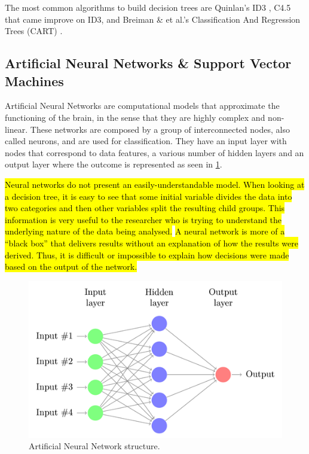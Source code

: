 The most common algorithms to build decision trees are Quinlan’s ID3 \cite{Quinlan1986}, C4.5
 \cite{Quinlan1993} that came improve on ID3, and Breiman \& et al.’s Classification And 
 Regression Trees (CART) \cite{Breiman1984}.

\subsection{Artificial Neural Networks \& Support Vector Machines}
\label{subsection:nn}

Artificial Neural Networks are computational models that approximate the functioning of the brain, in the sense that they are highly
 complex and non-linear. These networks are composed by a group of interconnected nodes, also called neurons, and are used for classification. 
 They have an input layer with nodes that correspond to data features, a various number of hidden layers and an output layer where the outcome 
 is represented as seen in \ref{fig:nn}.

\hl{Neural networks do not present an easily-understandable model. When looking at a decision tree, it is easy to see that some initial variable
 divides the data into two categories and then other variables split the resulting child groups. This information is very useful to the researcher
 who is trying to understand the underlying nature of the data being analysed.}
\hl{A neural network is more of a “black box” that delivers results without an explanation of how the results were derived. Thus, it is difficult or
 impossible to explain how decisions were made based on the output of the network.}

\begin{figure}[!htb]
  \centering
  \includegraphics[width=1\textwidth]{Figures/nn.png}
  \caption{Artificial Neural Network structure.}
  \label{fig:nn}
\end{figure}


